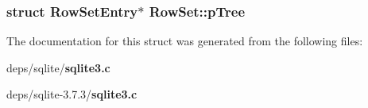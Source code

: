 \subsubsection{\setlength{\rightskip}{0pt plus 5cm}struct \bf{Row\-Set\-Entry}$\ast$ \bf{Row\-Set::p\-Tree}}\label{structRowSet_3839627e2aceb7648646a72d69694b25}




The documentation for this struct was generated from the following files:\begin{CompactItemize}
\item 
deps/sqlite/\bf{sqlite3.c}\item 
deps/sqlite-3.7.3/\bf{sqlite3.c}\end{CompactItemize}
